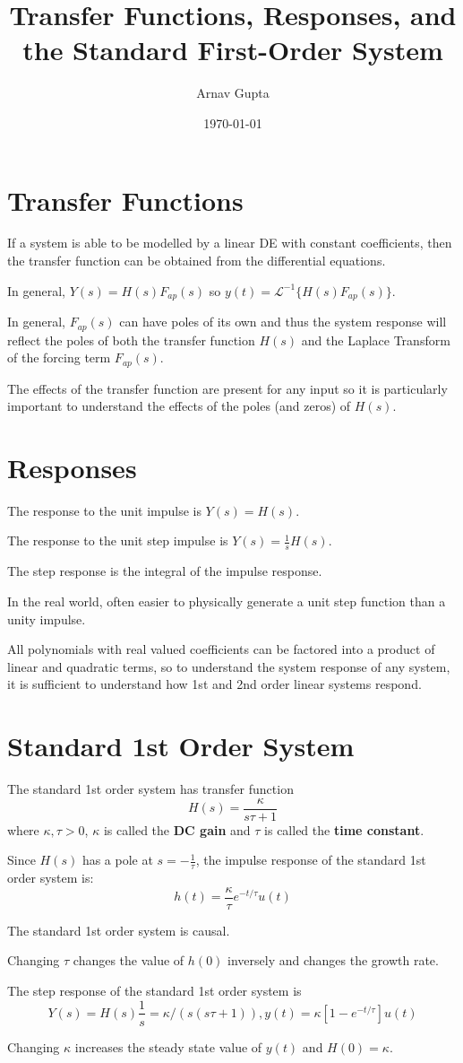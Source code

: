 \documentclass[11pt]{article}
\author{Arnav Gupta}
\date{\today}
\title{Transfer Functions, Responses, and the Standard First-Order System}
\begin{document}
\maketitle
\tableofcontents

\section{Transfer Functions}
\label{sec:org3634146}
If a system is able to be modelled by a linear DE with constant coefficients, then the
transfer function can be obtained from the differential equations.

In general, \(Y(s) = H(s) F_{ap}(s)\) so \(y(t) = \mathscr{L}^{-1} \{ H(s) F_{ap}(s) \}\).

In general, \(F_{ap}(s)\) can have poles of its own and thus the system response will
reflect the poles of both the transfer function \(H(s)\) and the Laplace Transform of
the forcing term \(F_{ap}(s)\).

The effects of the transfer function are present for any input so it is particularly
important to understand the effects of the poles (and zeros) of \(H(s)\).
\section{Responses}
\label{sec:org720624d}
The response to the unit impulse is \(Y(s) = H(s)\).

The response to the unit step impulse is \(Y(s) = \frac{1}{s} H(s)\).

The step response is the integral of the impulse response.

In the real world, often easier to physically generate a unit step function than a
unity impulse.

All polynomials with real valued coefficients can be factored into a product of
linear and quadratic terms, so to understand the system response of any system,
it is sufficient to understand how 1st and 2nd order linear systems respond.
\section{Standard 1st Order System}
\label{sec:org47ec93d}
The standard 1st order system has transfer function
$$
        H(s) = \frac{\kappa}{s \tau + 1}
$$
where \(\kappa, \tau > 0\), \(\kappa\) is called the \textbf{DC gain} and \(\tau\) is called
the \textbf{time constant}.

Since \(H(s)\) has a pole at \(s = -\frac{1}{\tau}\), the impulse response of the
standard 1st order system is:
$$
        h(t) = \frac{\kappa}{\tau} e^{-t / \tau} u(t)
$$

The standard 1st order system is causal.

Changing \(\tau\) changes the value of \(h(0)\) inversely and changes the growth rate.

The step response of the standard 1st order system is
$$
        Y(s) = H(s) \frac{1}{s} = \kappa/(s(s\tau + 1)), y(t) = \kappa [ 1 - e^{-t / \tau}] u(t)
$$

Changing \(\kappa\) increases the steady state value of \(y(t)\) and \(H(0) = \kappa\).
\end{document}
